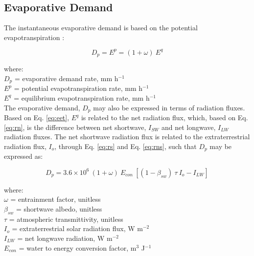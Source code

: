 \subsection{Evaporative Demand}
\label{sec:dp}
The instantaneous evaporative demand is based on the potential evapotranspiration \parencite{federer82}:

\begin{equation}
\label{eq:dp}
	D_p = E^p = \left(1 + \omega \right)\: E^q
\end{equation}

\noindent where: \\
\indent $D_p$ = evaporative demand rate, mm h$^{-1}$\\
\indent $E^p$ = potential evapotranspiration rate, mm h$^{-1}$\\
\indent $E^q$ = equilibrium evapotranspiration rate, mm h$^{-1}$\\

\noindent The evaporative demand, $D_p$ may also be expressed in terms of radiation fluxes. 
Based on Eq. \ref{eq:eet}, $E^q$ is related to the net radiation flux, which, based on Eq. \ref{eq:rn}, is the difference between net shortwave, $I_{SW}$ and net longwave, $I_{LW}$ radiation fluxes. 
The net shortwave radiation flux is related to the extraterrestrial radiation flux, $I_o$, through Eq. \ref{eq:rs} and Eq. \ref{eq:rns}, such that $D_p$ may be expressed as:

\begin{equation}
\label{eq:dpa}
	D_p = 3.6\times 10^6\: \left(1 + \omega \right)\: E_{con}\:\left[
		\left(1 - \beta_{sw} \right)\: \tau\: I_o - I_{LW} \right]
\end{equation}

\noindent where:\\
\indent $\omega$ = entrainment factor, unitless \\
\indent $\beta_{sw}$ = shortwave albedo, unitless \\
\indent $\tau$ = atmospheric transmittivity, unitless \\
\indent $I_o$ = extraterrestrial solar radiation flux, W m$^{-2}$ \\
\indent $I_{LW}$ = net longwave radiation, W m$^{-2}$ \\
\indent $E_{con}$ = water to energy conversion factor, m$^{3}$ J$^{-1}$\\

